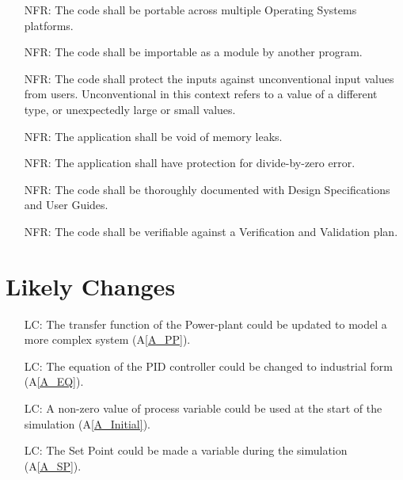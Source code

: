 \documentclass[12pt]{article}
\newcommand{\aref}[1]{A\ref{#1}}
\newcounter{reqnum} %
\newcounter{nfreqnum} %
\newcounter{lcnum} %
\begin{document}
\noindent \begin{itemize}

\item[NFR\refstepcounter{nfreqnum}\thenfreqnum \label{R_Portability}:] The code
shall be portable across multiple Operating Systems platforms.

\item[NFR\refstepcounter{nfreqnum}\thenfreqnum \label{R_Usability1}:] The code
shall be importable as a module by another program. 

\item[NFR\refstepcounter{nfreqnum}\thenfreqnum \label{R_Security1}:] The code 
shall protect the inputs against unconventional input values from users. 
Unconventional in this context refers to a value of a different type, or 
unexpectedly large or small values. 

\item[NFR\refstepcounter{nfreqnum}\thenfreqnum \label{R_Security2}:] The 
application shall be void of memory leaks.

\item[NFR\refstepcounter{nfreqnum}\thenfreqnum \label{R_Security3}:] The 
application shall have protection for divide-by-zero error.

\item[NFR\refstepcounter{nfreqnum}\thenfreqnum \label{R_Maintainability}:] The 
code shall be thoroughly documented with Design Specifications and User Guides.

\item[NFR\refstepcounter{nfreqnum}\thenfreqnum \label{R_Verifiable}:] The code
shall be verifiable against a Verification and Validation plan.

\end{itemize}

\section{Likely Changes}    

\noindent \begin{itemize}

\item[LC\refstepcounter{lcnum}\thelcnum\label{LC_PP}:]  The transfer function of the Power-plant could be updated 
    to model a more complex system (\aref{A_PP}).
    
\item[LC\refstepcounter{lcnum}\thelcnum\label{LC_EQ}:] The equation of the 
    PID controller could be changed to industrial form (\aref{A_EQ}).
    
\item[LC\refstepcounter{lcnum}\thelcnum\label{LC_Initial}:] A non-zero value
    of process variable could be used at the start of the simulation 
    (\aref{A_Initial}).
    
\item[LC\refstepcounter{lcnum}\thelcnum\label{LC_SP}:] The Set Point could be 
    made a variable during the simulation (\aref{A_SP}).

\end{itemize}
\end{document}

